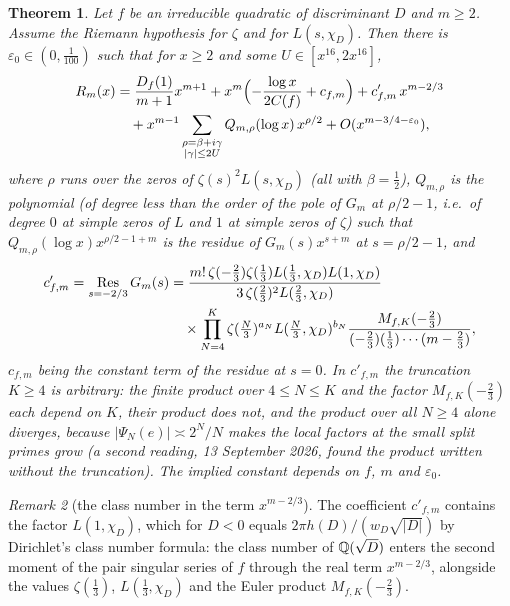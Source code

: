 \documentclass[11pt,a4paper]{article}
\newtheorem{theorem}{Theorem}
\theoremstyle{remark}\newtheorem{remark}[theorem]{Remark}
\begin{document}
\begin{theorem}\label{thm:explicit-quadratic}
Let $f$ be an irreducible quadratic of discriminant $D$ and $m\ge2$. Assume the Riemann hypothesis for
$\zeta$ and for $L(s,\chi_D)$. Then there is $\varepsilon_0\in(0,\tfrac1{100})$ such that for $x\ge2$ and some
$U\in[x^{16},2x^{16}]$,
\begin{equation}\label{eq:explicit}
\begin{split}
R_m(x)&=\frac{D_f(1)}{m+1}x^{m+1}+x^m\Bigl(-\frac{\log x}{2C(f)}+c_{f,m}\Bigr)+c'_{f,m}\,x^{m-2/3}\\
&\quad+x^{m-1}\sum_{\substack{\rho=\beta+i\gamma\\|\gamma|\le2U}}Q_{m,\rho}(\log x)\,x^{\rho/2}+O(x^{m-3/4-\varepsilon_0}),
\end{split}
\end{equation}
where $\rho$ runs over the zeros of $\zeta(s)^2L(s,\chi_D)$ (all with $\beta=\tfrac12$), $Q_{m,\rho}$ is the
polynomial (of degree less than the order of the pole of $G_m$ at $\rho/2-1$, i.e.\ of degree $0$ at simple
zeros of $L$ and $1$ at simple zeros of $\zeta$) such that $Q_{m,\rho}(\log x)x^{\rho/2-1+m}$ is the residue
of $G_m(s)x^{s+m}$ at $s=\rho/2-1$, and
\[
\begin{aligned}
c'_{f,m}=\operatorname*{Res}_{s=-2/3}G_m(s)&=\frac{m!\,\zeta(-\tfrac23)\zeta(\tfrac13)L(\tfrac13,\chi_D)L(1,\chi_D)}{3\,\zeta(\tfrac23)^2L(\tfrac23,\chi_D)}\\
&\quad\times\prod_{N=4}^{K}\zeta(\tfrac N3)^{a_N}L(\tfrac N3,\chi_D)^{b_N}\frac{M_{f,K}(-\tfrac23)}{(-\tfrac23)(\tfrac13)\cdots(m-\tfrac23)},
\end{aligned}
\]
$c_{f,m}$ being the constant term of the residue at $s=0$. In $c'_{f,m}$ the truncation $K\ge4$ is arbitrary: the
finite product over $4\le N\le K$ and the factor $M_{f,K}(-\tfrac23)$ each depend on $K$, their product does not, and
the product over all $N\ge4$ alone diverges, because $|\Psi_N(e)|\asymp2^N/N$ makes the local factors at the small
split primes grow (a second reading, 13 September 2026, found the product written without the truncation). The implied constant depends on $f$, $m$ and
$\varepsilon_0$.
\end{theorem}

\begin{remark}[the class number in the term $x^{m-2/3}$]
The coefficient $c'_{f,m}$ contains the factor $L(1,\chi_D)$, which for $D<0$ equals $2\pi h(D)/(w_D\sqrt{|D|})$
by Dirichlet's class number formula: the class number of $\mathbb{Q}(\sqrt D)$ enters the second moment of the pair
singular series of $f$ through the real term $x^{m-2/3}$, alongside the values $\zeta(\tfrac13)$,
$L(\tfrac13,\chi_D)$ and the Euler product $M_{f,K}(-\tfrac23)$.
\end{remark}
\end{document}
